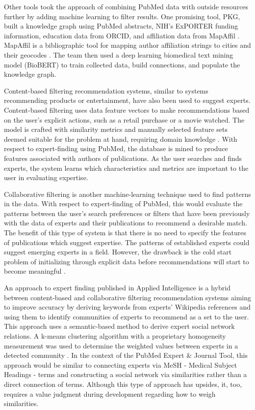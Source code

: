 Other tools took the approach of combining PubMed data with outside resources further by adding machine learning to filter results. One promising tool, PKG, built a knowledge graph using PubMed abstracts, NIH’s ExPORTER funding information, education data from ORCID, and affiliation data from MapAffil \cite{ref-pubmed-knowledge-graph}. MapAffil is a bibliographic tool for mapping author affiliation strings to cities and their geocodes \cite{ref-pubmed-mapaffil}. The team then used a deep learning biomedical text mining model (BioBERT) to train collected data, build connections, and populate the knowledge graph.

Content-based filtering recommendation systems, similar to systems recommending products or entertainment, have also been used to suggest experts. Content-based filtering uses data feature vectors to make recommendations based on the user's explicit actions, such as a retail purchase or a movie watched. The model is crafted with similarity metrics and manually selected feature sets deemed suitable for the problem at hand, requiring domain knowledge \cite{ref-google-content-filtering}. With respect to expert-finding using PubMed, the database is mined to produce features associated with authors of publications. As the user searches and finds experts, the system learns which characteristics and metrics are important to the user in evaluating expertise.

Collaborative filtering is another machine-learning technique used to find patterns in the data. With respect to expert-finding of PubMed, this would evaluate the patterns between the user's search preferences or filters that have been previously with the data of experts and their publications to recommend a desirable match. The benefit of this type of system is that there is no need to specify the features of publications which suggest expertise. The patterns of established experts could suggest emerging experts in a field. However, the drawback is the cold start problem of initializing through explicit data before recommendations will start to become meaningful \cite{ref-google-collaborative-filtering}.

An approach to expert finding published in Applied Intelligence is a hybrid between content-based and collaborative filtering recommendation systems aiming to improve accuracy by deriving keywords from experts’ Wikipedia references and using them to identify communities of experts to recommend as a set to the user. This approach uses a semantic-based method to derive expert social network relations. A k-means clustering algorithm with a proprietary homogeneity measurement was used to determine the weighted values between experts in a detected community \cite{ref-semantic-social-network}. In the context of the PubMed Expert \& Journal Tool, this approach would be similar to connecting experts via MeSH - Medical Subject Headings - terms and constructing a social network via similarities rather than a direct connection of terms. Although this type of approach has upsides, it, too, requires a value judgment during development regarding how to weigh similarities.

